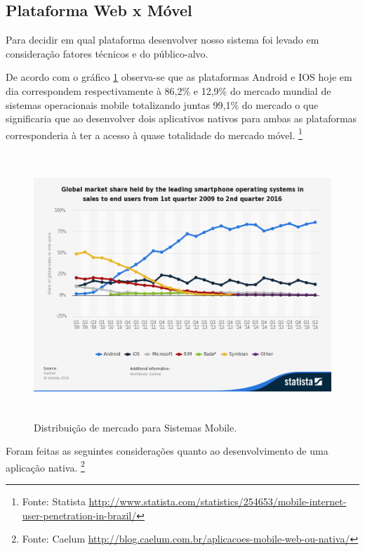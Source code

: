\subsection{Plataforma Web x Móvel}
\par Para decidir em qual plataforma desenvolver nosso sistema foi levado em consideração fatores técnicos e do público-alvo.
\par De acordo com o gráfico \ref{fig:global_market_sharing} observa-se que as plataformas Android e IOS hoje em dia correspondem respectivamente à 86,2\%  e 12,9\% do mercado mundial de sistemas operacionais mobile totalizando juntas 99,1\% do mercado o que significaria que ao desenvolver dois aplicativos nativos para ambas as plataformas corresponderia à ter a acesso à quase totalidade do mercado móvel. \footnote{Fonte: Statista   \url{http://www.statista.com/statistics/254653/mobile-internet-user-penetration-in-brazil/}}
\begin{figure}[htb]
\includegraphics[height=10cm]{figuras/global_market_sharing}
\caption{\label{fig:global_market_sharing} Distribuição de mercado para Sistemas Mobile.}
\end{figure}
\par Foram feitas  as seguintes considerações quanto ao desenvolvimento de uma aplicação nativa. \footnote{Fonte: Caelum \url{http://blog.caelum.com.br/aplicacoes-mobile-web-ou-nativa/}}
